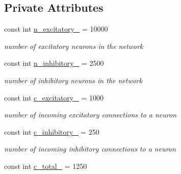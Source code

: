 \subsection*{Private Attributes}
\begin{DoxyCompactItemize}
\item 
\hypertarget{classNetwork_a25f7fbea76b8115bed5e2bb737ed2b35}{const int \hyperlink{classNetwork_a25f7fbea76b8115bed5e2bb737ed2b35}{n\-\_\-excitatory\-\_\-} = 10000}\label{classNetwork_a25f7fbea76b8115bed5e2bb737ed2b35}

\begin{DoxyCompactList}\small\item\em number of excitatory neurons in the network \end{DoxyCompactList}\item 
\hypertarget{classNetwork_a895e24952ca3c5772a678af298dd15f0}{const int \hyperlink{classNetwork_a895e24952ca3c5772a678af298dd15f0}{n\-\_\-inhibitory\-\_\-} = 2500}\label{classNetwork_a895e24952ca3c5772a678af298dd15f0}

\begin{DoxyCompactList}\small\item\em number of inhibitory neurons in the network \end{DoxyCompactList}\item 
\hypertarget{classNetwork_abac57666745803e5e0fa37f41af53561}{const int \hyperlink{classNetwork_abac57666745803e5e0fa37f41af53561}{c\-\_\-excitatory\-\_\-} = 1000}\label{classNetwork_abac57666745803e5e0fa37f41af53561}

\begin{DoxyCompactList}\small\item\em number of incoming excitatory connections to a neuron \end{DoxyCompactList}\item 
\hypertarget{classNetwork_a417303b8fe7428ebe294fbac5695217a}{const int \hyperlink{classNetwork_a417303b8fe7428ebe294fbac5695217a}{c\-\_\-inhibitory\-\_\-} = 250}\label{classNetwork_a417303b8fe7428ebe294fbac5695217a}

\begin{DoxyCompactList}\small\item\em number of incoming inhibitory connections to a neuron \end{DoxyCompactList}\item 
\hypertarget{classNetwork_afccfb0a1a9efd8479e5d1a87c1cc7f1a}{const int \hyperlink{classNetwork_afccfb0a1a9efd8479e5d1a87c1cc7f1a}{c\-\_\-total\-\_\-} = 1250}\label{classNetwork_afccfb0a1a9efd8479e5d1a87c1cc7f1a}


\end{DoxyCompactItemize}
